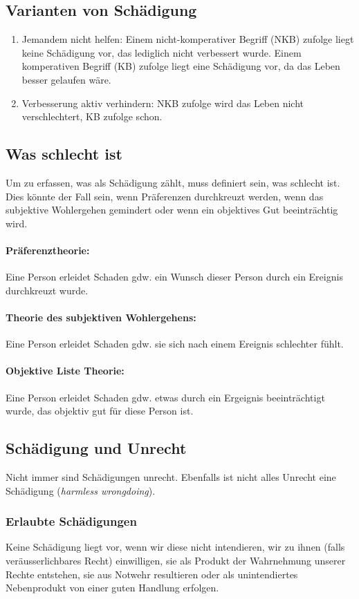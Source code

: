 \documentclass[../main.tex]{subfiles}
\begin{document}
\subsection{Varianten von Schädigung}
\begin{enumerate}[label=(\alph*)]
	\item Jemandem nicht helfen: Einem nicht-komperativer Begriff (NKB) zufolge liegt keine Schädigung vor, das lediglich nicht verbessert wurde. Einem komperativen Begriff (KB) zufolge liegt eine Schädigung vor, da das Leben besser gelaufen wäre. 
	\item Verbesserung aktiv verhindern: NKB zufolge wird das Leben nicht verschlechtert, KB zufolge schon.
\end{enumerate}

\subsection{Was schlecht ist}
Um zu erfassen, was als Schädigung zählt, muss definiert sein, was schlecht ist. Dies könnte der Fall sein, wenn Präferenzen durchkreuzt werden, wenn das subjektive Wohlergehen gemindert oder wenn ein objektives Gut beeinträchtig wird.

\paragraph{Präferenztheorie:} Eine Person erleidet Schaden gdw. ein Wunsch dieser Person durch ein Ereignis durchkreuzt wurde.
\paragraph{Theorie des subjektiven Wohlergehens:} Eine Person erleidet Schaden gdw. sie sich nach einem Ereignis schlechter fühlt.
\paragraph{Objektive Liste Theorie:} Eine Person erleidet Schaden gdw. etwas durch ein Ergeignis beeinträchtigt wurde, das objektiv gut für diese Person ist. 

\subsection{Schädigung und Unrecht}
Nicht immer sind Schädigungen unrecht. Ebenfalls ist nicht alles Unrecht eine Schädigung (\textit{harmless wrongdoing}). 

\subsubsection{Erlaubte Schädigungen}
\begin{warningbox}
Keine Schädigung liegt vor, wenn wir diese nicht intendieren, wir zu ihnen (falls veräusserlichbares Recht) einwilligen, sie als Produkt der Wahrnehmung unserer Rechte entstehen, sie aus Notwehr resultieren oder als unintendiertes Nebenprodukt von einer guten Handlung erfolgen. 
\end{warningbox}
\end{document}
